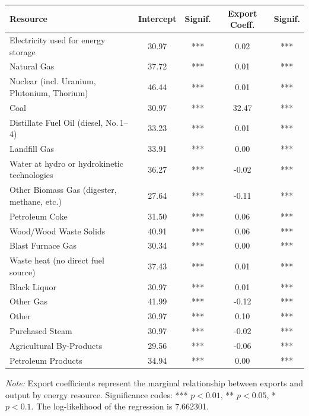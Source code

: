 \documentclass[12pt]{article}
\begin{document}
\begin{tabular}{lcccc}
\toprule
\textbf{Resource} & \textbf{Intercept} & \textbf{Signif.} & \textbf{Export Coeff.} & \textbf{Signif.} \\
\midrule
Electricity used for energy storage & 30.97 & *** & 0.02 & *** \\
Natural Gas                         & 37.72& *** & 0.01 &  ***\\
Nuclear (incl. Uranium, Plutonium, Thorium) & 46.44 & *** & 0.01 & *** \\
Coal                                & 30.97 & *** & 32.47 & *** \\
Distillate Fuel Oil (diesel, No.\,1--4) & 33.23 &  *** & 0.01 & *** \\
Landfill Gas                        & 33.91 & *** & 0.00 & *** \\
Water at hydro or hydrokinetic technologies & 36.27 & *** & -0.02 & *** \\
Other Biomass Gas (digester, methane, etc.) & 27.64 & *** & -0.11 & *** \\
Petroleum Coke                      & 31.50 & *** & 0.06 &  ***\\
Wood/Wood Waste Solids              & 40.91 &  ***& 0.06 &  ***\\
Blast Furnace Gas                   & 30.34 & *** & 0.00 &  ***\\
Waste heat (no direct fuel source) & 37.43 & *** & 0.01 &  ***\\
Black Liquor                        & 30.97 & *** & 0.01 & *** \\
Other Gas                           & 41.99 & *** & -0.12 & *** \\
Other                               & 30.97 & *** & 0.10 & *** \\
Purchased Steam                     & 30.97 & *** & -0.02 & *** \\
Agricultural By-Products            & 29.56 & *** & -0.06 &  ***\\
Petroleum Products                  & 34.94 & *** & 0.00 & *** \\
\bottomrule
\end{tabular}
\vspace{0.5em}

\footnotesize\textit{Note:} Export coefficients represent the marginal relationship between exports and output by energy resource. Significance codes: *** $p<0.01$, ** $p<0.05$, * $p<0.1$. The log-likelihood of the regression is 7.662301.
\label{ResourcesTable}
\end{document}

